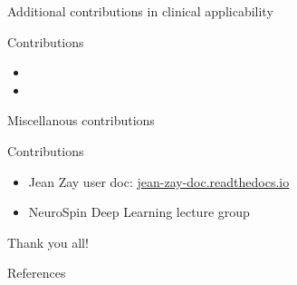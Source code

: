 \documentclass[aspectratio=169,xcolor=dvipsnames]{beamer}
\begin{document}
\begin{frame}{Additional contributions in clinical applicability}
    \begin{exampleblock}{Contributions}
        \begin{itemize}
            \item {}
            \item {}
        \end{itemize}
    \end{exampleblock}
\end{frame}

\begin{frame}{Miscellanous contributions}
    \begin{exampleblock}{Contributions}
        \begin{itemize}
            \item Jean Zay user doc: \href{https://jean-zay-doc.readthedocs.io/}{jean-zay-doc.readthedocs.io}
            \item NeuroSpin Deep Learning lecture group
        \end{itemize}
    \end{exampleblock}
\end{frame}

\begin{frame}{Thank you all!}
\end{frame}



\begin{frame}[allowframebreaks]{References}
    \printbibliography
\end{frame}
\end{document}
